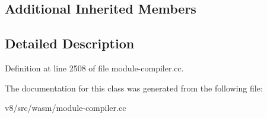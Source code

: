 \subsection*{Additional Inherited Members}


\subsection{Detailed Description}


Definition at line 2508 of file module-\/compiler.\+cc.



The documentation for this class was generated from the following file\+:\begin{DoxyCompactItemize}
\item 
v8/src/wasm/module-\/compiler.\+cc\end{DoxyCompactItemize}
